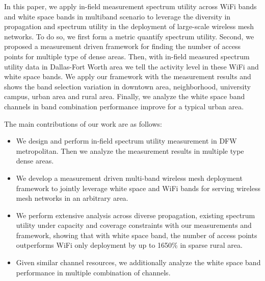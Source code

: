 In this paper, we apply in-field measurement spectrum utility across WiFi bands and white
space bands in multiband scenario to leverage the diversity in propagation 
and spectrum utility in the deployment of large-scale wireless mesh networks. 
To do so, we first form a metric quantify spectrum utility. 
Second, we proposed a measurement driven framework for finding the number of 
access points for multiple type of dense areas. Then, with in-field measured spectrum utility
data in Dallas-Fort Worth area we tell the activity level in these WiFi and white space bands. 
We apply our framework with the measurement results and shows the band selection 
variation in downtown area, neighborhood, university campus, urban area and rural area.
Finally, we analyze the white space band channels in band combination performance improve 
for a typical urban area.

The main contributions of our work are as follows:
\begin{itemize}
\item We design and perform in-field spectrum utility measurement in DFW metropolitan.
 Then we analyze the measurement results in multiple type dense areas.
\item We develop a measurement driven multi-band wireless mesh deployment framework 
to jointly leverage white space and WiFi bands for serving wireless mesh networks in an arbitrary area.  
\item We perform extensive analysis across diverse propagation, existing spectrum utility under capacity
 and coverage constraints with our measurements and framework, showing that with white space band, 
 the number of access points outperforms WiFi only deployment by up to 1650\% in sparse rural area.
\item Given similar channel resources, we additionally analyze the white space band performance in multiple
combination of channels. 
\end{itemize}


